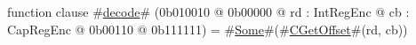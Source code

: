 function clause #\hyperref[sailMIPSzdecode]{decode}# (0b010010 @ 0b00000 @ rd : IntRegEnc @ cb : CapRegEnc @    0b00110 @ 0b111111) = #\hyperref[sailMIPSzSome]{Some}#(#\hyperref[sailMIPSzCGetOffset]{CGetOffset}#(rd, cb))

